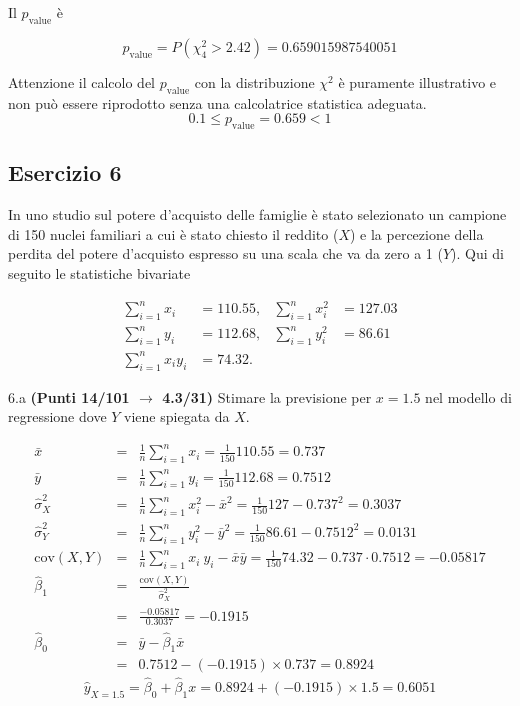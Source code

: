\documentclass[
  11pt,
]{book}
\theoremstyle{mytheoremstyle}
\theoremstyle{mydefstyle}
\newenvironment{sol}
  {
  \begin{tcolorbox}[enhanced,breakable,arc=0.1mm,boxrule=1pt,colback=white,colframe=iblue,
  title=\bf \fontfamily{lmss}\selectfont \hspace{.5 cm} Soluzione,drop fuzzy shadow]

}{
\end{tcolorbox}
  }
\begin{document}
\begin{sol}
Il \(p_{\text{value}}\) è

\[ p_{\text{value}} = P(\chi^2_{4}>2.42)=0.659015987540051 \]

Attenzione il calcolo del \(p_\text{value}\) con la distribuzione \(\chi^2\) è puramente illustrativo e non può essere riprodotto senza una calcolatrice statistica adeguata.\[
 0.1 \leq p_\text{value}= 0.659 < 1 
\]

\end{sol}

\subsection{Esercizio 6}\label{esercizio-6-8}

In uno studio sul potere d'acquisto delle famiglie è stato selezionato un campione di 150 nuclei familiari
a cui è stato chiesto il reddito (\(X\)) e la percezione della perdita del potere d'acquisto espresso su una scala che va da zero a 1 (\(Y\)).
Qui di seguito le statistiche bivariate

\begin{align*}
\sum_{i=1}^n x_i &= 110.55,   &\sum_{i=1}^n x_i^2 &= 127.03 \\
\sum_{i=1}^n y_i &= 112.68,   &\sum_{i=1}^n y_i^2 &= 86.61 \\
\sum_{i=1}^n x_iy_i &= 74.32.    
\end{align*}

6.a \textbf{(Punti 14/101 \(\rightarrow\) 4.3/31)} Stimare la previsione per \(x=1.5\) nel modello di regressione dove \(Y\) viene spiegata da \(X\).

\begin{sol}
\begin{eqnarray*}
           \bar x &=&\frac 1 n\sum_{i=1}^n x_i = \frac {1}{ 150 }  110.55 =  0.737 \\
           \bar y &=&\frac 1 n\sum_{i=1}^n y_i = \frac {1}{ 150 }  112.68 =  0.7512 \\
           \hat\sigma_X^2&=&\frac 1 n\sum_{i=1}^n x_i^2-\bar x^2=\frac {1}{ 150 }  127  - 0.737 ^2= 0.3037 \\
           \hat\sigma_Y^2&=&\frac 1 n\sum_{i=1}^n y_i^2-\bar y^2=\frac {1}{ 150 }  86.61  - 0.7512 ^2= 0.0131 \\
           \text{cov}(X,Y)&=&\frac 1 n\sum_{i=1}^n x_i~y_i-\bar x\bar y=\frac {1}{ 150 }  74.32 - 0.737 \cdot 0.7512 = -0.05817 \\
           \hat\beta_1 &=& \frac{\text{cov}(X,Y)}{\hat\sigma_X^2} \\
                    &=& \frac{ -0.05817 }{ 0.3037 }  =  -0.1915 \\
           \hat\beta_0 &=& \bar y - \hat\beta_1 \bar x\\
                    &=&  0.7512 - (-0.1915) \times  0.737 = 0.8924 
         \end{eqnarray*}\[\hat y_{X= 1.5 }=\hat\beta_0+\hat\beta_1 x= 0.8924 + (-0.1915) \times 1.5 = 0.6051 \]

\end{sol}
\end{document}
